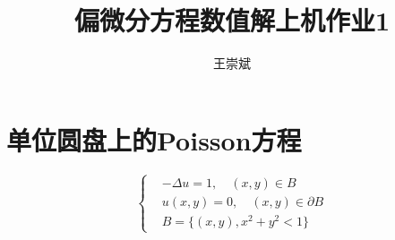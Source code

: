 \documentclass[a4paper,zihao=5,UTF8]{ctexart}
\title{\textbf{偏微分方程数值解上机作业1}}
\author{王崇斌\;2201110455}
\begin{document}
	\pagestyle{fancy}
	\pagestyle{fancy}
	\chead{}
	\rhead{\today}
	\maketitle
    \thispagestyle{fancy}

	\section{单位圆盘上的Poisson方程}

	\begin{equation}
		\left\{
			\begin{aligned}
				&-\Delta u = 1, \quad (x, y) \in B\\
				&u(x, y) = 0, \quad (x, y) \in \partial B\\
				&B = \{(x, y), x^2 + y^2 < 1\}
			\end{aligned}
		\right.
	\end{equation}
\end{document}
